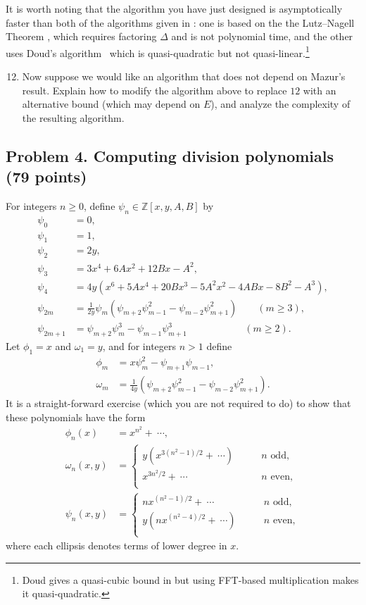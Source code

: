 \documentclass[11pt]{article}
\newcommand{\Z}{\mathbb{Z}}
\begin{document}
It is worth noting that the algorithm you have just designed is asymptotically faster than both of the algorithms given in \cite{washington}: one is based on the the Lutz--Nagell Theorem \cite[Thm.\ 8.7]{washington}, which requires factoring $\Delta$ and is not polynomial time, and the other uses Doud's algorithm~\cite{doud} which is quasi-quadratic but not quasi-linear.\footnote{Doud gives a quasi-cubic bound in \cite{doud} but using FFT-based multiplication makes it quasi-quadratic.}

\begin{enumerate}[{\bf (a)}]
\setcounter{enumi}{11}
\item Now suppose we would like an algorithm that does not depend on Mazur's result.  Explain how to modify the algorithm above to replace $12$ with an alternative bound (which may depend on $E$), and analyze the complexity of the resulting algorithm.
\end{enumerate}

\subsection*{Problem 4. Computing division polynomials (79 points)}
For integers $n\ge 0$, define $\psi_n\in\Z[x,y,A,B]$ by
\begin{align*}
\psi_0 &= 0,\\
\psi_1 &= 1,\\
\psi_2 &= 2y,\\
\psi_3 &= 3x^4+6Ax^2+12Bx-A^2,\\
\psi_4 &= 4y(x^6+5Ax^4+20Bx^3-5A^2x^2-4ABx-8B^2-A^3),\\
\psi_{2m}&=\frac{1}{2y}\psi_m(\psi_{m+2}\psi_{m-1}^2-\psi_{m-2}\psi_{m+1}^2)\qquad(m\ge 3),\\
\psi_{2m+1}&=\psi_{m+2}\psi_m^3-\psi_{m-1}\psi_{m+1}^3 \hspace{70pt}(m\ge 2).
\end{align*}
Let $\phi_1=x$ and $\omega_1=y$, and for integers $n>1$ define
\begin{align*}
\phi_m &=x\psi_m^2-\psi_{m+1}\psi_{m-1},\\
\omega_m &=\frac{1}{4y}(\psi_{m+2}\psi_{m-1}^2-\psi_{m-2}\psi_{m+1}^2).
\end{align*}
 It is a straight-forward exercise (which you are not required to do) to show that these polynomials have the form
\begin{align*}
\phi_n(x) &= x^{n^2} +\  \cdots,\\
\omega_n(x,y) &=
\begin{cases}
y(x^{3(n^2-1)/2} +\  \cdots)\qquad &n \text{ odd},\\
x^{3n^2/2} +\  \cdots\qquad&n \text { even},\\
\end{cases}\\
\psi_n(x,y) &=
\begin{cases}
nx^{(n^2-1)/2} +\  \cdots\qquad& n \text{ odd},\\
y(nx^{(n^2-4)/2} +\  \cdots)\qquad &n \text { even},\\
\end{cases}
\end{align*}
where each ellipsis denotes terms of lower degree in $x$.
\bigskip
\end{document}
